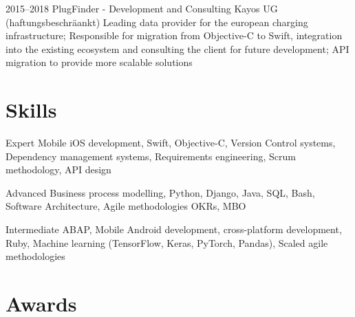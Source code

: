 \documentclass[]{friggeri-cv} %
\begin{document}
\begin{entrylist}
	
	\entry
	{2015--2018}
	{PlugFinder - Development and Consulting}
	{Kayos UG (haftungsbeschr\"{a}ankt)}
	{Leading data provider for the european charging infrastructure; Responsible for migration from Objective-C to Swift, integration into the existing ecosystem and consulting the client for future development; API migration to provide more scalable solutions}
\end{entrylist}


\section{Skills}

\begin{entrylist}
	
	
	\smallentry
	{Expert}
	{Mobile iOS development, Swift, Objective-C, Version Control systems, Dependency management systems, Requirements engineering, Scrum methodology, API design}
	
	
	\smallentry
	{Advanced}
	{Business process modelling, Python, Django, Java, SQL, Bash, Software Architecture, Agile methodologies OKRs, MBO}
	
	
	\smallentry
	{Intermediate}
	{ABAP, Mobile Android development, cross-platform development, Ruby, Machine learning (TensorFlow, Keras, PyTorch, Pandas), Scaled agile methodologies}
	
	
\end{entrylist}

\pagebreak


\section{Awards}
\end{document}
